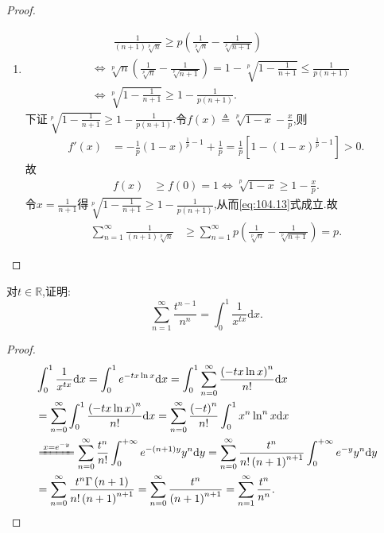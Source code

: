 \documentclass[../../main.tex]{subfiles}%
\begin{document}
\begin{proof}
\begin{enumerate}
\item \begin{align}
&\quad \quad \frac{1}{\left( n+1 \right) \sqrt[p]{n}}\geqslant p\left( \frac{1}{\sqrt[p]{n}}-\frac{1}{\sqrt[p]{n+1}} \right) \label{eq:104.13} \\
&\Longleftrightarrow \sqrt[p]{n}\left( \frac{1}{\sqrt[p]{n}}-\frac{1}{\sqrt[p]{n+1}} \right) =1-\sqrt[p]{1-\frac{1}{n+1}}\leqslant \frac{1}{p\left( n+1 \right)}\nonumber \\
&\Longleftrightarrow \sqrt[p]{1-\frac{1}{n+1}}\geqslant 1-\frac{1}{p\left( n+1 \right)}.\nonumber
\end{align}
下证$\sqrt[p]{1-\frac{1}{n+1}}\geqslant 1-\frac{1}{p\left( n+1 \right)}$.令$f\left( x \right) \triangleq \sqrt[p]{1-x}-\frac{x}{p}$,则
\begin{align*}
f\prime \left( x \right) &=-\frac{1}{p}\left( 1-x \right) ^{\frac{1}{p}-1}+\frac{1}{p}=\frac{1}{p}\left[ 1-\left( 1-x \right) ^{\frac{1}{p}-1} \right] >0.
\end{align*}
故
\begin{align*}
f\left( x \right) &\geqslant f\left( 0 \right) =1\Longleftrightarrow \sqrt[p]{1-x}\geqslant 1-\frac{x}{p}.
\end{align*}
令$x=\frac{1}{n+1}$得$\sqrt[p]{1-\frac{1}{n+1}}\geqslant 1-\frac{1}{p\left( n+1 \right)}$,从而\eqref{eq:104.13}式成立.故
\begin{align*}
\sum_{n=1}^{\infty}{\frac{1}{\left( n+1 \right) \sqrt[p]{n}}}&\geqslant \sum_{n=1}^{\infty}{p\left( \frac{1}{\sqrt[p]{n}}-\frac{1}{\sqrt[p]{n+1}} \right)}=p.
\end{align*}
\end{enumerate}

\end{proof}

\begin{example}
对$t \in \mathbb{R}$,证明:
$$\sum_{n=1}^\infty \frac{t^{n-1}}{n^n}=\int_0^1 \frac{1}{x^{tx}}\mathrm{d}x.$$
\end{example}
\begin{proof}

\begin{align*}
&\int_0^1{\frac{1}{x^{tx}}\mathrm{d}x}=\int_0^1{e^{-tx\ln x}\mathrm{d}x}=\int_0^1{\sum_{n=0}^{\infty}{\frac{\left( -tx\ln x \right) ^n}{n!}\mathrm{d}x}}
\\
&=\sum_{n=0}^{\infty}{\int_0^1{\frac{\left( -tx\ln x \right) ^n}{n!}\mathrm{d}x}}=\sum_{n=0}^{\infty}{\frac{\left( -t \right) ^n}{n!}\int_0^1{x^n\ln ^nx\mathrm{d}x}}
\\
&\xlongequal{x=e^{-y}}\sum_{n=0}^{\infty}{\frac{t^n}{n!}\int_0^{+\infty}{e^{-\left( n+1 \right) y}y^n\mathrm{d}y}}=\sum_{n=0}^{\infty}{\frac{t^n}{n!\left( n+1 \right) ^{n+1}}\int_0^{+\infty}{e^{-y}y^n\mathrm{d}y}}
\\
&=\sum_{n=0}^{\infty}{\frac{t^n\Gamma \left( n+1 \right)}{n!\left( n+1 \right) ^{n+1}}}=\sum_{n=0}^{\infty}{\frac{t^n}{\left( n+1 \right) ^{n+1}}}=\sum_{n=1}^{\infty}{\frac{t^n}{n^n}}.
\end{align*}

\end{proof}
\end{document}
